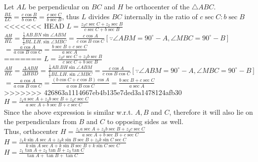 \documentclass[aspectratio=169,8pt]{beamer}
\begin{document}
\begin{frame}
  Let $AL$ be perpendicular on $BC$ and $H$ be orthocenter of the $\triangle ABC$.\\
  \vspace*{0.2cm}
  $\frac{BL}{LC} = \frac{c\cos B}{b\cos C} = \frac{c\sec C}{b\sec B}$, thus $L$ divides $BC$ internally in the ratio of $c\sec
  C:b\sec B$\\
<<<<<<< HEAD
  $L = \frac{z_3c\sec C + z_2\sec B}{c\sec C + b\sec B}$\\
  \vspace*{0.2cm}
  $\frac{AH}{HL} = \frac{\frac{1}{2}AB.BN\sin\angle ABM}{\frac{1}{2}BL.LH.\sin\angle MBC} = \frac{c\cos A}{c\cos B\cos C}[\because \angle ABM = 90^\circ - A, \angle MBC = 90^\circ - B]$\\
  $= \frac{a\cos A}{a\cos B\cos C} = \frac{b\sec B + c\sec C}{a\sec A}$\\
=======
  $L = \frac{z_3c\sec C + z_2b\sec B}{c\sec C + b\sec B}$\\
  \vspace*{0.2cm}
  $\frac{AH}{HL} = \frac{\Delta ABH}{\Delta HBD} = \frac{\frac{1}{2}AB.BH\sin\angle ABM}{\frac{1}{2}BL.LH.\sin\angle MBC} = \frac{c\cos A}{c\cos B\cos C}[\because \angle ABM = 90^\circ - A, \angle MBC = 90^\circ - B]$\\
  $= \frac{a\cos A}{a\cos B\cos C} = \frac{(b\cos C + c\cos B)\cos A}{a\cos B\cos C} = \frac{b\sec B + c\sec C}{a\sec A}$\\
>>>>>>> 426863a1114667eb4b135e7ded3a1478124afb30
  \vspace*{0.2cm}
  $H = \frac{z_1a\sec A + z_2b\sec B + z_3c\sec C}{a\sec A + b\sec B + c\sec C}$\\
  \vspace*{0.2cm}
  Since the above expression is similar w.r.t. $A, B$ and $C$, therefore it will also lie on the perpendiculars from $B$ and $C$ to
  opposing sides as well.\\
  \vspace*{0.2cm}
  Thus, orthocenter $H = \frac{z_1a\sec A + z_2b\sec B + z_3c\sec C}{a\sec A + b\sec B + c\sec C}$\\
  \vspace*{0.2cm}
  $H = \frac{z_1k\sin A\sec A + z_2k\sin B\sec B + z_3k\sin C\sec C}{k\sin A\sec A + k\sin B\sec B + k\sin C\sec C}$\\
  \vspace*{0.2cm}
  $H = \frac{z_1\tan A + z_2\tan B + z_3\tan C}{\tan A + \tan B + \tan C}$
\end{frame}
\end{document}
